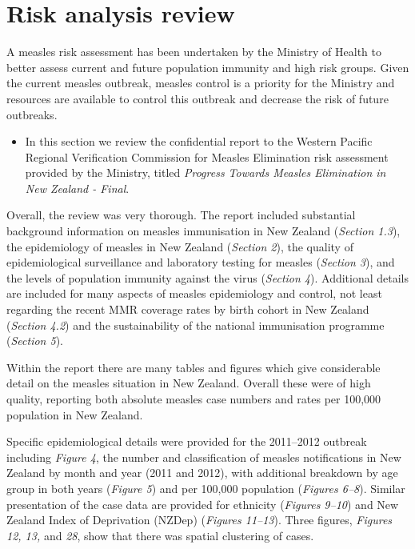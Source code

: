 \documentclass{article}
\begin{document}
\section{Risk analysis review}

A measles risk assessment has been undertaken by the Ministry of Health to better assess current and future population immunity and high risk groups. Given the current measles outbreak, measles control is a priority for the Ministry and resources are available to control this outbreak and decrease the risk of future outbreaks.
\begin{itemize}
\item In this section we review the confidential report to the Western Pacific Regional Verification Commission for Measles Elimination risk assessment provided by the Ministry, titled \emph {Progress Towards Measles Elimination in New Zealand - Final}.
\end{itemize}

Overall, the review was very thorough. The report included substantial background information on measles immunisation in New Zealand (\emph{Section 1.3}), the epidemiology of measles in New Zealand (\emph{Section 2}), the quality of epidemiological surveillance and laboratory testing for measles (\emph{Section 3}), and the levels of population immunity against the virus (\emph{Section 4}). Additional details are included for many aspects of measles epidemiology and control, not least regarding the recent MMR coverage rates by birth cohort in New Zealand (\emph{Section 4.2}) and the sustainability of the national immunisation programme (\emph{Section 5}).

Within the report there are many tables and figures which give considerable detail on the measles situation in New Zealand. Overall these were of high quality, reporting both absolute measles case numbers and rates per 100,000 population in New Zealand.

Specific epidemiological details were provided for the 2011--2012 outbreak including \emph{Figure 4}, the number and classification of measles notifications in New Zealand by month and year (2011 and 2012), with additional breakdown by age group in both years (\emph{Figure 5}) and per 100,000 population (\emph{Figures 6--8}). Similar presentation of the case data are provided for ethnicity (\emph{Figures 9--10}) and New Zealand Index of Deprivation (NZDep) (\emph{Figures 11--13}). Three figures, \emph{Figures 12, 13,} and \emph{28}, show that there was spatial clustering of cases.
\end{document}
